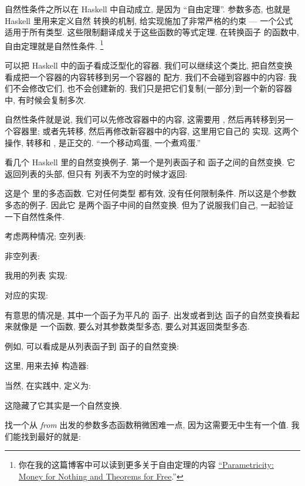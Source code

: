 自然性条件之所以在 Haskell 中自动成立, 是因为 ``自由定理''. 参数多态, 也就是 Haskell 里用来定义自然
转换的机制, 给实现施加了非常严格的约束 --- 一个公式适用于所有类型. 这些限制翻译成关于这些函数的等式定理. 在转换函子
的函数中, 自由定理就是自然性条件. \footnote{
  你在我的这篇博客中可以读到更多关于自由定理的内容 \href{https://bartoszmilewski.com/2014/09/22/parametricity-money-for-nothing-and-theorems-for-free/}{``Parametricity:
    Money for Nothing and Theorems for Free}.''}

可以把 Haskell 中的函子看成泛型化的容器. 我们可以继续这个类比, 把自然变换看成把一个容器的内容转移到另一个容器的
配方. 我们不会碰到容器中的内容: 我们不会修改它们, 也不会创建新的. 我们只是把它们复制(一部分)到一个新的容器中,
有时候会复制多次.

自然性条件就是说, 我们可以先修改容器中的内容, 这需要用 , 然后再转移到另一个容器里; 或者先转移,
然后再修改新容器中的内容, 这里用它自己的  实现. 这两个操作, 转移和 , 是正交的.
``一个移动鸡蛋, 一个煮鸡蛋.''

看几个 Haskell 里的自然变换例子. 第一个是列表函子和  函子之间的自然变换. 它返回列表的头部, 但只有
列表不为空的时候才返回:

这是个  里的多态函数. 它对任何类型  都有效, 没有任何限制条件. 所以这是个参数多态的例子. 因此它
是两个函子中间的自然变换. 但为了说服我们自己, 一起验证一下自然性条件.

考虑两种情况; 空列表:


非空列表:


我用的列表  实现:

 对应的实现:

有意思的情况是, 其中一个函子为平凡的  函子. 出发或者到达  函子的自然变换看起来就像是
一个函数, 要么对其参数类型多态, 要么对其返回类型多态.

例如,  可以看成是从列表函子到  函子的自然变换:

这里,  用来去掉  构造器:

当然, 在实践中,  定义为:

这隐藏了它其实是一个自然变换.

找一个从  \emph{from} 出发的参数多态函数稍微困难一点, 因为这需要无中生有一个值. 我们能找到最好的就是:

